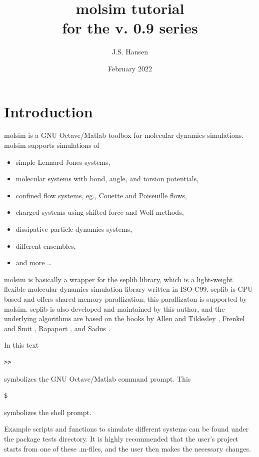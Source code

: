 \documentclass[11pt]{article}
\title{\textsf{molsim} tutorial \\ \bigskip \tiny{for the v. 0.9 series}}
\author{J.S. Hansen}
\date{February 2022}
\begin{document}
\maketitle

\section{Introduction}

\textsf{molsim} is a GNU Octave/Matlab toolbox for molecular dynamics
simulations. \textsf{molsim} supports simulations of
\begin{itemize}
\item simple Lennard-Jones systems,
\item molecular systems with bond, angle, and torsion potentials, 
\item confined flow systems, eg., Couette and Poiseuille flows,
\item charged systems using shifted force and Wolf methods,
\item dissipative particle dynamics systems,
\item different ensembles, 
\item and more \ldots
\end{itemize}

\bigskip
\noindent \textsf{molsim} is basically a wrapper for the \textsf{seplib}
library, which is a light-weight flexible molecular dynamics simulation library
written in ISO-C99. \textsf{seplib} is CPU-based and offers shared memory
parallization; this parallizaton is supported by
\textsf{molsim}. \textsf{seplib} is also developed and maintained by this
author, and the underlying algorithms are based on the books by Allen and
Tildesley \cite{AllenTildesley}, Frenkel and Smit \cite{FrenkelSmit}, Rapaport
\cite{Rapaport}, and Sadus \cite{Sadus}.

\bigskip
\noindent In this text
\begin{verbatim}
>> 
\end{verbatim}
symbolizes the GNU Octave/Matlab command prompt. This 
\begin{verbatim}
$ 
\end{verbatim}
symbolizes the shell prompt.

\bigskip
\noindent Example scripts and functions to simulate different systems can be
found under the package \textsf{tests} directory. It is highly recommended that
the user's project starts from one of these \textsf{.m}-files, and the user
then makes the necessary changes.  
\end{document}
